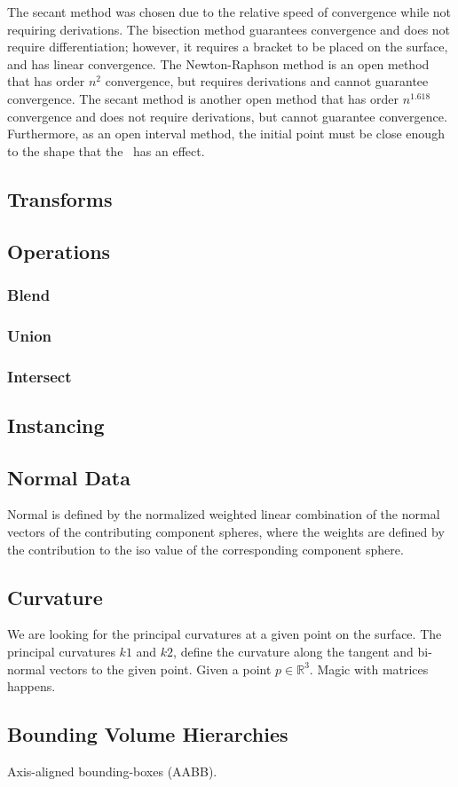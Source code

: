 \documentclass[conference]{acmsiggraph}
\begin{document}
The secant method was chosen due to the relative speed of convergence while not
requiring derivations. The bisection method guarantees convergence and does not
require differentiation; however, it requires a bracket to be placed on the
surface, and has linear convergence. The Newton-Raphson method is an open
method that has order $n^2$ convergence, but requires derivations and cannot
guarantee convergence. The secant method is another open method that has order
$n^1.618$ convergence and does not require derivations, but cannot guarantee
convergence. Furthermore, as an open interval method, the initial point must be
close enough to the shape that the \fff\ has an effect.
\subsection{Transforms}
\subsection{Operations}
\subsubsection{Blend}
\subsubsection{Union}
\subsubsection{Intersect}
\subsection{Instancing}
\subsection{Normal Data}
Normal is defined by the normalized weighted linear combination of the normal
vectors of the contributing component spheres, where the weights are defined by
the contribution to the iso value of the corresponding component
sphere\cite{Wyvill}.
\subsection{Curvature}
We are looking for the principal curvatures at a given point on the surface.
The principal curvatures $k1$ and $k2$, define the curvature along the tangent
and bi-normal vectors to the given point.
Given a point $p \in \mathbb{R}^3$. Magic with matrices
happens\cite{DeAraujo2004}.
\subsection{Bounding Volume Hierarchies}
Axis-aligned bounding-boxes (AABB).



\end{document}

